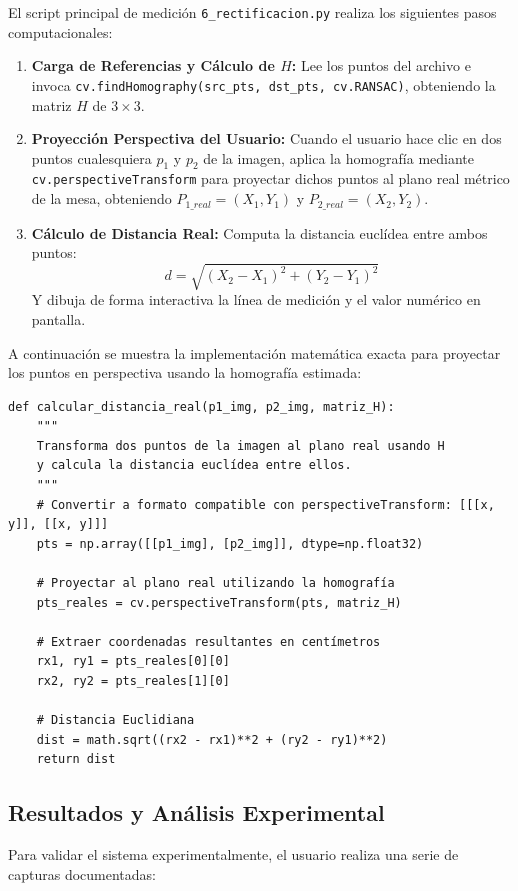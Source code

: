 \documentclass[12pt,a4paper]{article}
\begin{document}
El script principal de medición \texttt{6\_rectificacion.py} realiza los siguientes pasos computacionales:
\begin{enumerate}
    \item \textbf{Carga de Referencias y Cálculo de $H$:} Lee los puntos del archivo e invoca \texttt{cv.findHomography(src\_pts, dst\_pts, cv.RANSAC)}, obteniendo la matriz $H$ de $3 \times 3$.
    \item \textbf{Proyección Perspectiva del Usuario:} Cuando el usuario hace clic en dos puntos cualesquiera $p_1$ y $p_2$ de la imagen, aplica la homografía mediante \texttt{cv.perspectiveTransform} para proyectar dichos puntos al plano real métrico de la mesa, obteniendo $P_{1\_real} = (X_1, Y_1)$ y $P_{2\_real} = (X_2, Y_2)$.
    \item \textbf{Cálculo de Distancia Real:} Computa la distancia euclídea entre ambos puntos:
    \begin{equation}
        d = \sqrt{(X_2 - X_1)^2 + (Y_2 - Y_1)^2}
    \end{equation}
    Y dibuja de forma interactiva la línea de medición y el valor numérico en pantalla.
\end{enumerate}

A continuación se muestra la implementación matemática exacta para proyectar los puntos en perspectiva usando la homografía estimada:
\begin{verbatim}
def calcular_distancia_real(p1_img, p2_img, matriz_H):
    """
    Transforma dos puntos de la imagen al plano real usando H
    y calcula la distancia euclídea entre ellos.
    """
    # Convertir a formato compatible con perspectiveTransform: [[[x, y]], [[x, y]]]
    pts = np.array([[p1_img], [p2_img]], dtype=np.float32)
    
    # Proyectar al plano real utilizando la homografía
    pts_reales = cv.perspectiveTransform(pts, matriz_H)
    
    # Extraer coordenadas resultantes en centímetros
    rx1, ry1 = pts_reales[0][0]
    rx2, ry2 = pts_reales[1][0]
    
    # Distancia Euclidiana
    dist = math.sqrt((rx2 - rx1)**2 + (ry2 - ry1)**2)
    return dist
\end{verbatim}


\subsection{Resultados y Análisis Experimental}

Para validar el sistema experimentalmente, el usuario realiza una serie de capturas documentadas:
\end{document}
